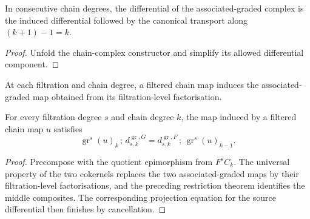 \begin{theorem}
  \label{thm:filtered-associated-graded-complex-d}
  \leanok
  In consecutive chain degrees, the differential of the associated-graded
  complex is the induced differential followed by the canonical transport
  along $(k+1)-1=k$.
\end{theorem}

\begin{proof}
  \leanok
  Unfold the chain-complex constructor and simplify its allowed differential
  component.
\end{proof}

\begin{definition}
  \label{def:filtered-associated-graded-map}
  \leanok
  At each filtration and chain degree, a filtered chain map induces the
  associated-graded map obtained from its filtration-level factorisation.
\end{definition}

\begin{theorem}
  \label{thm:filtered-associated-graded-map-comm}
  \leanok
  For every filtration degree $s$ and chain degree $k$, the map induced by a
  filtered chain map $u$ satisfies
  \[
    \operatorname{gr}^s(u)_k\,;\,d^{\operatorname{gr},G}_{s,k}
      =d^{\operatorname{gr},F}_{s,k}\,;\,\operatorname{gr}^s(u)_{k-1}.
  \]
\end{theorem}

\begin{proof}
  \leanok
  Precompose with the quotient epimorphism from $F^sC_k$.  The universal
  property of the two cokernels replaces the two associated-graded maps by
  their filtration-level factorisations, and the preceding restriction
  theorem identifies the middle composites.  The corresponding projection
  equation for the source differential then finishes by cancellation.
\end{proof}

